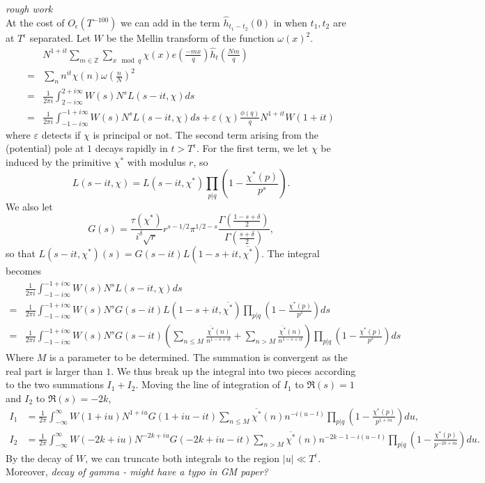 \ 
\\ \ 
\\
\textit{rough work}\ \\
At the cost of $O_\epsilon(T^{-100})$ we can add in the term $\hat{h}_{t_1-t_2}(0)$ in when $t_1,t_2$ are at $T^\epsilon$ separated. Let $W$ be the Mellin transform of the function $\omega(x)^2$.
\begin{align*}
    &N^{1+it}\sum_{m\in \mathbb{Z}} \sum_{x \mod q}\chi(x) e\left(\frac{-mx}{q}\right)
    \hat{h}_{t}\left(\frac{Nm}{q}\right) \\
    =& \sum_{n} n^{it}\chi(n)\omega\left(\frac{n}{N}\right)^2\\
    =& \frac{1}{2\pi i}\int_{2-i\infty}^{2+i\infty}W(s)N^sL(s-it,\chi) ds\\
    =& \frac{1}{2\pi i}\int_{-1-i\infty}^{-1+i\infty}W(s)N^sL(s-it,\chi) ds + \varepsilon(\chi)\frac{\phi(q)}{q}N^{1+it}W(1+it)
\end{align*}
where $\varepsilon$ detects if $\chi$ is principal or not. The second term arising from the (potential) pole at $1$ decays rapidly in $t>T^\epsilon$.
For the first term, we let $\chi$ be induced by the primitive $\chi^*$ with modulus $r$, so\[
    L(s-it,\chi)=L(s-it,\chi^*)\prod_{p|q} \left(1-\frac{\chi^*(p)}{p^s}\right).
\]
We also let \[
    G(s) =\frac{\tau(\chi^*)}{i^\delta\sqrt{r}}r^{s-1/2}\pi^{1/2-s}\frac{\Gamma(\frac{1-s+\delta}{2})}{\Gamma(\frac{s+\delta}{2})},
\]
so that $L(s-it,\chi^*)(s) = G(s-it)L(1-s+it,\overline{\chi^*})$. The integral becomes
\begin{align*}
   &\frac{1}{2\pi i}\int_{-1-i\infty}^{-1+i\infty}W(s)N^sL(s-it,\chi) ds \\=&\frac{1}{2\pi i}
   \int_{-1-i\infty}^{-1+i\infty}W(s)N^s
    G(s-it) L(1-s+it,\overline{\chi^*}) \prod_{p|q} \left(1-\frac{\chi^*(p)}{p^s}\right)ds\\
    =& \frac{1}{2\pi i}\int_{-1-i\infty}^{-1+i\infty}W(s)N^s
    G(s-it) 
    \left(\sum_{n\leq M}\frac{\overline{\chi^*}(n)}{n^{1-s+it}}+
    \sum_{n> M}\frac{\overline{\chi^*}(n)}{n^{1-s+it}}
   \right) \prod_{p|q} \left(1-\frac{\chi^*(p)}{p^s}\right)ds
\end{align*}
Where $M$ is a parameter to be determined. The summation is convergent as the real part is larger than $1$.
We thus break up the integral into two pieces according to the two summations $I_1+I_2$. Moving the line of integration of $I_1$ to $\Re(s)=1$ and $I_2$ to $\Re(s)=-2k$,
\begin{align*}
        I_1&= \frac{1}{2\pi}\int_{-\infty}^{\infty}W(1+iu)N^{1+iu}G(1+iu-it)\sum_{n\leq M}\overline{\chi^*}(n)n^{-i(u-t)}\prod_{p|q} \left(1-\frac{\chi^*(p)}{p^{1+iu}}\right)du,\\
        I_2&= \frac{1}{2\pi}\int_{-\infty}^{\infty}W(-2k+iu)N^{-2k+iu}G(-2k+iu-it)\sum_{n> M}\overline{\chi^*}(n)n^{-2k-1-i(u-t)}\prod_{p|q} \left(1-\frac{\chi^*(p)}{p^{-2k+iu}}\right)du.
\end{align*}
By the decay of $W$, we can truncate both integrals to the region $|u|\ll T^\epsilon$.
Moreover, \textit{decay of gamma - might have a typo in GM paper?}